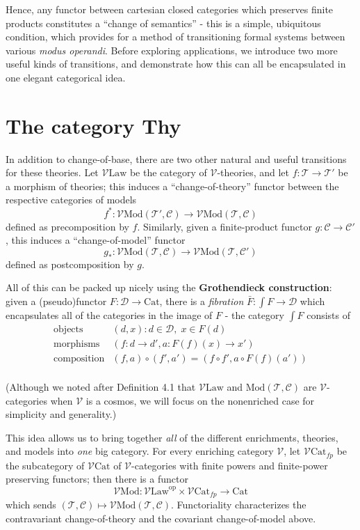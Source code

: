 \documentclass[a4paper,UKenglish]{article}
\theoremstyle{definition}
\newcommand{\Cat}{\mathrm{Cat}}
\newcommand{\Law}{\mathrm{Law}}
\newcommand{\Mod}{\mathrm{Mod}}
\newcommand{\op}{\mathrm{op}}
\newcommand{\V}{\mathscr{V}}
\newcommand{\D}{\mathscr{D}}
\newcommand{\C}{\mathscr{C}}
\newcommand{\T}{\mathscr{T}}
\begin{document}
Hence, any functor between cartesian closed categories which preserves finite products constitutes a ``change of semantics'' - this is a simple, ubiquitous condition, which provides for a method of transitioning formal systems between various \textit{modus operandi}. Before exploring applications, we introduce two more useful kinds of transitions, and demonstrate how this can all be encapsulated in one elegant categorical idea.

\section{The category Thy}

In addition to change-of-base, there are two other natural and useful transitions for these theories. Let $\V\mathrm{Law}$ be the category of $\V$-theories, and let $f:\T\to \T'$ be a morphism of theories; this induces a ``change-of-theory'' functor between the respective categories of models $$f^*:\V\Mod(\T',\C)\to \V\Mod(\T,\C)$$ defined as precomposition by $f$. Similarly, given a finite-product functor $g: \C \to \C'$, this induces a ``change-of-model'' functor $$g_*:\V\Mod(\T,\C) \to \V\Mod(\T,\C')$$ defined as postcomposition by $g$.

All of this can be packed up nicely using the \textbf{Grothendieck construction}: given a (pseudo)functor $F: \D \to \Cat$, there is a \textit{fibration} $\bar{F}: \int F \to \D$ which encapsulates all of the categories in the image of $F$ - the category $\int F$ consists of
\[\begin{array}{rl}
\text{objects} & (d,x) : d\in \D, \; x\in F(d)\\
\text{morphisms} & (f:d\to d',a:F(f)(x)\to x')\\
\text{composition} & (f,a) \circ (f',a') = (f \circ f', a \circ F(f)(a'))\\
\end{array}\]

(Although we noted after Definition 4.1 that $\V\Law$ and $\Mod(\T,\C)$ are $\V$-categories when $\V$ is a cosmos, we will focus on the nonenriched case for simplicity and generality.)

This idea allows us to bring together \textit{all} of the different enrichments, theories, and models into \textit{one} big category. For every enriching category $\V$, let $\V\Cat_{fp}$ be the subcategory of $\V\Cat$ of $\V$-categories with finite powers and finite-power preserving functors; then there is a functor $$\V\Mod: \V\Law^\op \times \V\Cat_{fp} \to \Cat$$ which sends $(\T,\C) \mapsto \V\Mod(\T,\C)$. Functoriality characterizes the contravariant change-of-theory and the covariant change-of-model above.
\end{document}
